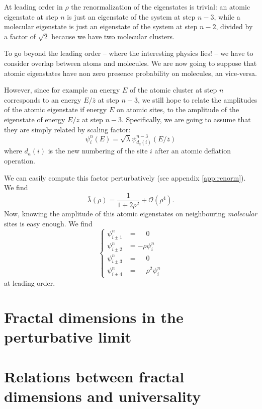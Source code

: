\documentclass[11pt]{article}
\newcommand{\zb}{\ensuremath{\overline{z}}}
\begin{document}
At leading order in $\rho$ the renormalization of the eigenstates is trivial: an atomic eigenstate at step $n$ is just an eigenstate of the system at step $n-3$, while a molecular eigenstate is just an eigenstate of the system at step $n-2$, divided by a factor of $\sqrt{2}$ because we have two molecular clusters.

To go beyond the leading order -- where the interesting physics lies! -- we have to consider overlap between atoms and molecules. We are now going to suppose that atomic eigenstates have non zero presence probability on molecules, an vice-versa.

However, since for example an energy $E$ of the atomic cluster at step $n$ corresponds to an energy $E/\zb$ at step $n-3$, we still hope to relate the amplitudes of the atomic eigenstate if energy $E$ on atomic sites, to the amplitude of the eigenstate of energy $E/\zb$ at step $n-3$. Specifically, we are going to assume that they are simply related by scaling factor:
 \begin{equation}
\label{eq:renorm_a}
	\psi_i^n(E) = \sqrt{\lambda} \psi^{n-3}_{d_a(i)}(E/\bar z)
\end{equation}
where $d_a(i)$ is the new numbering of the site $i$ after an atomic deflation operation.

We can easily compute this factor perturbatively (see appendix \eqref{app:renorm}). We find
\begin{equation}
	\bar \lambda(\rho) = \frac{1}{1+2\rho^2} +\mathcal{O}(\rho^4).
\end{equation}
Now, knowing the amplitude of this atomic eigenstates on neighbouring \emph{molecular} sites is easy enough. We find
\begin{equation}
	\begin{cases}
	\psi^n_{i\pm1} &= \phantom{-}0 \\
	\psi^n_{i\pm2} &= - \rho \psi^n_i \\
	\psi^n_{i\pm3} &= \phantom{-}0 \\
	\psi^n_{i\pm4} &= \phantom{-}\rho^2 \psi^n_i
	\end{cases}
\end{equation}
at leading order.

\section{Fractal dimensions in the perturbative limit}

\section{Relations between fractal dimensions and universality}
\end{document}
